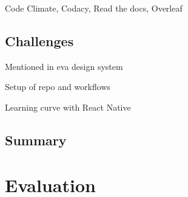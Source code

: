 \documentclass{l4proj}
\begin{document}
Code Climate, Codacy, Read the docs, Overleaf

\section{Challenges}

Mentioned in eva design system

Setup of repo and workflows

Learning curve with React Native

\section*{Summary}

















\chapter{Evaluation}
\end{document}

